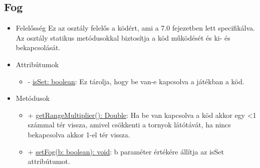 \subsection{Fog}
\begin{itemize}
\item Felelősség\newline
Ez az osztály felelős a ködért, ami a 7.0 fejezetben lett specifikálva. Az osztály statikus metódusokkal biztosítja a köd működését és ki- és bekapcsolását.
\item Attribútumok
	\begin{itemize}
		\item - \underline{isSet: boolean}: Ez tárolja, hogy be van-e kapcsolva a játékban a köd.
	\end{itemize}
\item Metódusok
	\begin{itemize}
		\item + \underline{getRangeMultiplier(): Double}: Ha be van kapcsolva a köd akkor egy <1 számmal tér vissza, amivel csökkenti a tornyok látótávát, ha nincs bekapcsolva akkor 1-el tér vissza.
		\item + \underline{setFog(b: boolean): void}: b paraméter értékére állítja az isSet attribútumot.
	\end{itemize}
\end{itemize}

